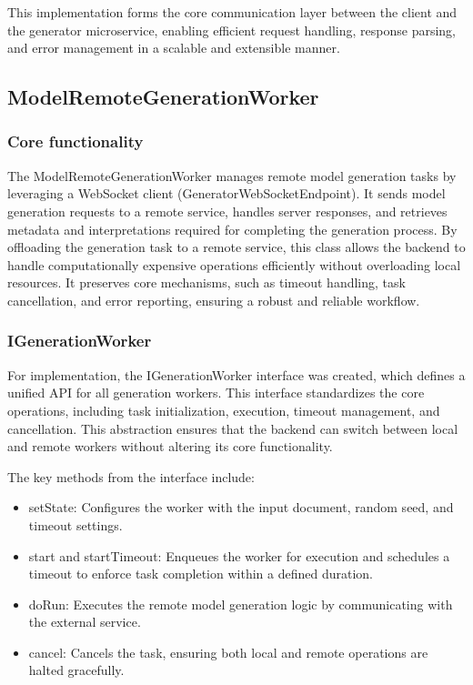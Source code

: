 			This implementation forms the core communication layer between the client and the generator microservice, enabling efficient 
			request handling, response parsing, and error management in a scalable and extensible manner.


		\subsection{ModelRemoteGenerationWorker}
			\subsubsection{Core functionality}
				The ModelRemoteGenerationWorker manages remote model generation tasks by leveraging a WebSocket client (GeneratorWebSocketEndpoint). 
				It sends model generation requests to a remote service, handles server responses, and retrieves metadata and interpretations required 
				for completing the generation process.
				By offloading the generation task to a remote service, this class allows the backend to handle computationally expensive operations 
				efficiently without overloading local resources. It preserves core mechanisms, such as timeout handling, task cancellation, 
				and error reporting, ensuring a robust and reliable workflow.

			\subsubsection{IGenerationWorker}
				For implementation, the IGenerationWorker interface was created, which defines a unified API for all generation workers. 
				This interface standardizes the core operations, including task initialization, execution, timeout management, and cancellation.
				This abstraction ensures that the backend can switch between local and remote workers without altering its core functionality.

				The key methods from the interface include:
				\begin{itemize}
					\item setState: Configures the worker with the input document, random seed, and timeout settings.
					\item start and startTimeout: Enqueues the worker for execution and schedules a timeout to enforce task completion within a defined duration.
					\item doRun: Executes the remote model generation logic by communicating with the external service.
					\item cancel: Cancels the task, ensuring both local and remote operations are halted gracefully.
				\end{itemize}

